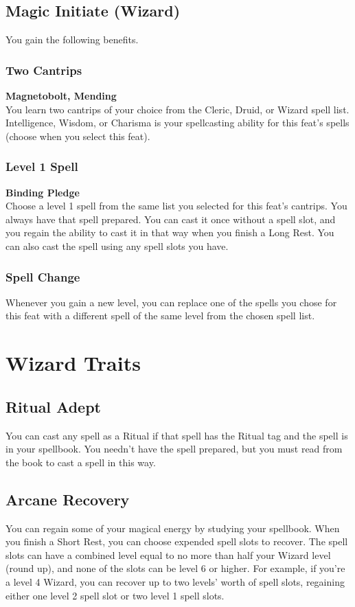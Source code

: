 \documentclass[letterpaper,openany,oneside,twocolumn]{book}
\begin{document}
\subsection*{Magic Initiate (Wizard)}
You gain the following benefits.
\subsubsection*{Two Cantrips}
\textbf{Magnetobolt, Mending}\\
You learn two cantrips of your choice from the Cleric, Druid, or Wizard spell list. Intelligence, Wisdom, or Charisma is your spellcasting ability for this feat's spells (choose when you select this feat).
\subsubsection*{Level 1 Spell}
\textbf{Binding Pledge}\\
Choose a level 1 spell from the same list you selected for this feat's cantrips. You always have that spell prepared. You can cast it once without a spell slot, and you regain the ability to cast it in that way when you finish a Long Rest. You can also cast the spell using any spell slots you have.
\subsubsection*{Spell Change}
Whenever you gain a new level, you can replace one of the spells you chose for this feat with a different spell of the same level from the chosen spell list.

\section*{Wizard Traits}
\subsection*{Ritual Adept}
You can cast any spell as a Ritual if that spell has the Ritual tag and the spell is in your spellbook. You needn't have the spell prepared, but you must read from the book to cast a spell in this way.
\subsection*{Arcane Recovery}
You can regain some of your magical energy by studying your spellbook. When you finish a Short Rest, you can choose expended spell slots to recover. The spell slots can have a combined level equal to no more than half your Wizard level (round up), and none of the slots can be level 6 or higher. For example, if you're a level 4 Wizard, you can recover up to two levels' worth of spell slots, regaining either one level 2 spell slot or two level 1 spell slots.
\end{document}
